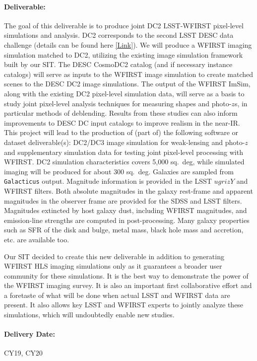 \paragraph*{Deliverable:} The goal of this deliverable is to produce joint DC2
LSST-WFIRST pixel-level simulations and analysis. DC2 corresponds to the second
LSST DESC data challenge (details can be found here
\href{https://github.com/LSSTDESC/DC2-production/tree/master/Documents/DC2_Plan}{[Link]}).
We will produce a WFIRST imaging simulation matched to DC2, utilizing the
existing image simulation framework built by our SIT. The DESC CosmoDC2 catalog (and
if necessary instance catalogs) will serve as inputs to the WFIRST image
simulation to create matched scenes to the DESC DC2 image simulations. The
output of the WFIRST ImSim, along with the existing DC2 pixel-level simulation
data, will serve as a basis to study joint pixel-level analysis techniques for
measuring shapes and photo-$z$s, in particular methods of deblending. Results
from these studies can also inform improvements to DESC DC input catalogs to
improve realism in the near-IR. This project will lead to the production of
(part of) the following software or dataset deliverable(s): DC2/DC3 image
simulation for weak-lensing and photo-$z$ and supplementary simulation data for
testing joint pixel-level processing with WFIRST. DC2 simulation characteristics 
covers 5,000 sq.~deg, while simulated imaging will be produced for about 300 sq.~deg.
Galaxies are sampled from \texttt{Galacticus} output. Magnitude information is provided in
the LSST $ugrizY$ and WFIRST filters. Both absolute magnitudes in the galaxy
rest-frame and apparent magnitudes in the observer frame are provided for the
SDSS and LSST filters. Magnitudes extincted by host galaxy dust, including WFIRST
magnitudes, and emission-line strengths are computed in post-processing. Many
galaxy properties such as SFR of the disk and bulge, metal mass, black hole mass
and accretion, etc. are available too.

Our SIT decided to create this new deliverable in addition to generating WFIRST HLS
imaging simulations only as it guarantees a broader user community for these
simulations. It is the best way to demonstrate the power of the WFIRST imaging
survey. It is also an important first collaborative effort and a foretaste of
what will be done when actual LSST and WFIRST data are present. It also allows
key LSST and WFIRST experts to jointly analyze these simulations, which will
undoubtedly enable new studies.

\paragraph*{Delivery Date:} CY19, CY20

